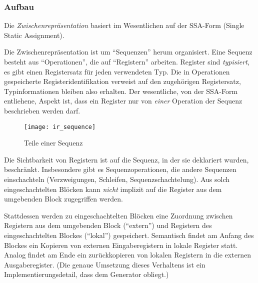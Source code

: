\documentclass[twoside,a4paper,fleqn,12pt]{article}
\begin{document}
\subsubsection{Aufbau}

Die \emph{Zwischenrepräsentation} basiert im Wesentlichen auf der SSA-Form (Single Static Assignment).


Die Zwischenrepräsentation ist um "`Sequenzen"' herum organisiert. Eine Sequenz besteht aus "`Operationen"',
die auf "`Registern"' arbeiten. Register sind \emph{typisiert}, es gibt einen Registersatz für jeden verwendeten Typ.
Die in Operationen gespeicherte Registeridentifikation verweist auf den zugehörigen Registersatz, Typinformationen bleiben also erhalten.
Der wesentliche, von der SSA-Form entliehene, Aspekt ist, dass ein Register nur von \emph{einer} Operation der Sequenz beschrieben werden darf.

\begin{figure}[h]
   \centering
  \texttt{[image: ir\_sequence]}
  \caption{Teile einer Sequenz}
  \label{fig:ir_sequence}
\end{figure}

Die Sichtbarkeit von Registern ist auf die Sequenz, in der sie deklariert wurden, beschränkt.
Insbesondere gibt es Sequenzoperationen, die andere Sequenzen einschachteln (Verzweigungen, Schleifen, Sequenzschachtelung).
Aus solch eingeschachtelten Blöcken kann \emph{nicht} implizit auf die Register aus dem umgebenden Block
zugegriffen werden.

Stattdessen werden zu eingeschachtelten Blöcken eine Zuordnung zwischen Registern aus dem umgebenden Block
("`extern"') und
Registern des eingeschachtelten Blockes ("`lokal"') gespeichert.
Semantisch findet am Anfang des Blockes ein Kopieren von externen Eingaberegistern
in lokale Register statt. Analog findet am Ende ein zurückkopieren von lokalen Registern in die externen Ausgaberegister.
(Die genaue Umsetzung dieses Verhaltens ist ein Implementierungsdetail, dass dem Generator obliegt.)
\end{document}
